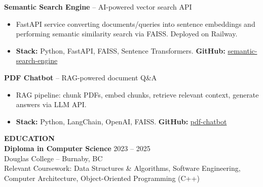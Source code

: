 \documentclass[10pt,letterpaper]{article}
\begin{document}
\textbf{Semantic Search Engine} -- AI-powered vector search API
\begin{itemize}
    \item FastAPI service converting documents/queries into sentence embeddings and performing semantic similarity search via FAISS. Deployed on Railway.
    \item \textbf{Stack:} Python, FastAPI, FAISS, Sentence Transformers. \textbf{GitHub:} \href{https://github.com/parsasamandi/semantic-search-engine}{semantic-search-engine}
\end{itemize}

\vspace{3pt}

\textbf{PDF Chatbot} -- RAG-powered document Q\&A
\begin{itemize}
    \item RAG pipeline: chunk PDFs, embed chunks, retrieve relevant context, generate answers via LLM API.
    \item \textbf{Stack:} Python, LangChain, OpenAI, FAISS. \textbf{GitHub:} \href{https://github.com/parsasamandi/pdf-chatbot}{pdf-chatbot}
\end{itemize}

\vspace{5pt}

\textbf{EDUCATION}\\[4pt]

\textbf{Diploma in Computer Science} \hfill 2023 -- 2025\\
Douglas College -- Burnaby, BC \\
Relevant Coursework: Data Structures \& Algorithms, Software Engineering, Computer Architecture, Object-Oriented Programming (C++)
\end{document}
